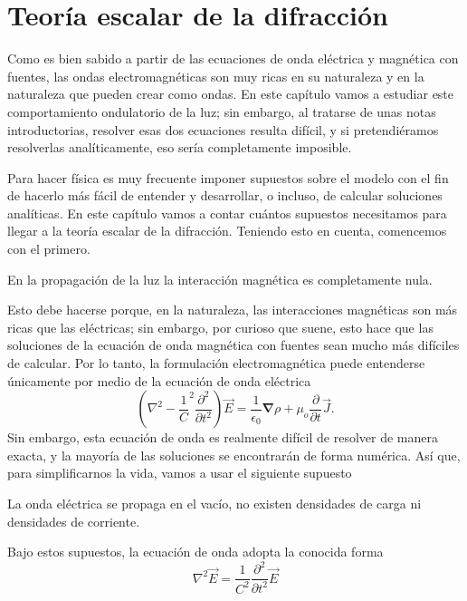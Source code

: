 \section{Teoría escalar de la difracción}\label{Sec:Diffraction}

	Como es bien sabido a partir de las ecuaciones de onda eléctrica y magnética con fuentes, las ondas electromagnéticas son muy ricas en su naturaleza y en la naturaleza que pueden crear como ondas. En este capítulo vamos a estudiar este comportamiento ondulatorio de la luz; sin embargo, al tratarse de unas notas introductorias, resolver esas dos ecuaciones resulta difícil, y si pretendiéramos resolverlas analíticamente, eso sería completamente imposible.

	Para hacer física es muy frecuente imponer supuestos sobre el modelo con el fin de hacerlo más fácil de entender y desarrollar, o incluso, de calcular soluciones analíticas. En este capítulo vamos a contar cuántos supuestos necesitamos para llegar a la teoría escalar de la difracción. Teniendo esto en cuenta, comencemos con el primero.

	\begin{Assumption}
		En la propagación de la luz la interacción magnética es completamente nula.
	\end{Assumption}

	Esto debe hacerse porque, en la naturaleza, las interacciones magnéticas son más ricas que las eléctricas; sin embargo, por curioso que suene, esto hace que las soluciones de la ecuación de onda magnética con fuentes sean mucho más difíciles de calcular. Por lo tanto, la formulación electromagnética puede entenderse únicamente por medio de la ecuación de onda eléctrica
	\begin{equation*}
		\left(\nabla^2 - \frac{1}{C}^2 \frac{\partial^2}{\partial t^2}\right)\vec{E} = \frac{1}{\epsilon_0}\bm{\nabla}\rho + \mu_o \frac{\partial}{\partial t}\vec{J}.
	\end{equation*}
	Sin embargo, esta ecuación de onda es realmente difícil de resolver de manera exacta, y la mayoría de las soluciones se encontrarán de forma numérica. Así que, para simplificarnos la vida, vamos a usar el siguiente supuesto

	\begin{Assumption}
		La onda eléctrica se propaga en el vacío, no existen densidades de carga ni densidades de corriente.
	\end{Assumption}
	Bajo estos supuestos, la ecuación de onda adopta la conocida forma
	\begin{equation}
		\nabla^2 \vec{E} = \frac{1}{C^2}\frac{\partial^2}{\partial t^2}\vec{E}
	\end{equation}

